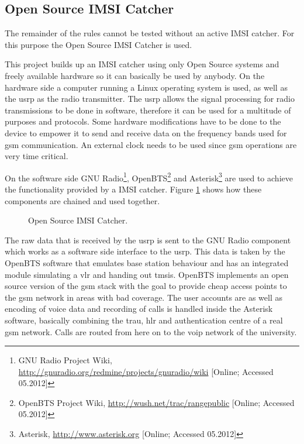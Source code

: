 \subsection{Open Source IMSI Catcher}
The remainder of the rules cannot be tested without an active IMSI catcher.
For this purpose the Open Source IMSI Catcher \cite{dennis} is used.

This project builds up an IMSI catcher using only Open Source systems and freely available hardware so it can basically be used by anybody.
On the hardware side a computer running a Linux operating system is used, as well as the \gls{usrp} as the radio transmitter.
The \gls{usrp} allows the signal processing for radio transmissions to be done in software, therefore it can be used for a multitude of purposes and protocols.
Some hardware modifications have to be done to the device to empower it to send and receive data on the frequency bands used for \gls{gsm} communication.
An external clock needs to be used since \gls{gsm} operations are very time critical.

On the software side GNU Radio\footnote{GNU Radio Project Wiki, \url{http://gnuradio.org/redmine/projects/gnuradio/wiki} [Online; Accessed 05.2012]}, OpenBTS\footnote{OpenBTS Project Wiki, \url{http://wush.net/trac/rangepublic} [Online; Accessed 05.2012]} and Asterisk\footnote{Asterisk, \url{http://www.asterisk.org} [Online; Accessed 05.2012]} are used to achieve the functionality provided by a IMSI catcher.
Figure \ref{fig:osic} shows how these components are chained and used together.
\begin{figure}
\caption{Open Source IMSI Catcher.}
\label{fig:osic}
\end{figure}
The raw data that is received by the \gls{usrp} is sent to the GNU Radio component which works as a software side interface to the \gls{usrp}.
This data is taken by the OpenBTS software that emulates base station behaviour and has an integrated module simulating a \gls{vlr} and handing out \glspl{tmsi}.
OpenBTS implements an open source version of the \gls{gsm} stack with the goal to provide cheap access points to the \gls{gsm} network in areas with bad coverage.
The user accounts are as well as encoding of voice data and recording of calls is handled inside the Asterisk software, basically combining the \gls{trau}, \gls{hlr} and authentication centre of a real \gls{gsm} network.
Calls are routed from here on to the \gls{voip} network of the university.

